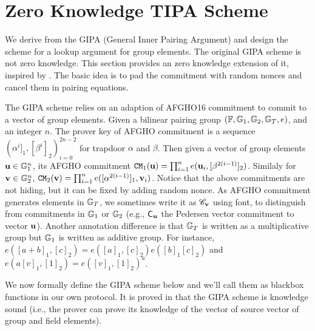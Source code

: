 \section{Zero Knowledge TIPA Scheme}
\label{sec:zkgipa}
We derive from the GIPA (General Inner Pairing Argument) \cite{Bunz21}
and design the scheme for a lookup argument for group elements.
The original GIPA scheme is not zero knowledge. This section provides
an zero knowledge extension of it, inspired by \cite[Appendix E]{Bunz21}.
The basic idea is to pad the commitment with random nonces and
cancel them in pairing equations.

The GIPA scheme relies on an adaption of
AFGHO16 commitment \cite{Abe16} to commit to a vector of group elements.
Given a bilinear pairing group $(\mathbb{F},{\mathbb{G}}_1, {\mathbb{G}}_2, {\mathbb{G}}_T, e)$, and an integer
$n$. The prover key of AFGHO commitment is a sequence
$\left(\alpha^{i}]_1, [\beta^{i}]_2\right)_{i=0}^{2n-2}$ for trapdoor
$\alpha$ and $\beta$. Then given a vector of group elements
${{\mathbf {u}}} \in {\mathbb{G}}_1^n$, its AFGHO commitment
${\mathtt{CM}}_1({{\mathbf {u}}}) = \prod_{i=1}^n e({{\mathbf {u}}}_i, [\beta^{2(i-1)}]_2)$.
Similaly for ${{\mathbf {v}}} \in {\mathbb{G}}_2^n$, 
${\mathtt{CM}}_2({{\mathbf {v}}}) = \prod_{i=1}^n e([\alpha^{2(i-1)}]_1, {{\mathbf {v}}}_i)$.
Notice that the above commitments are not hiding, but
it can be fixed by adding random nonce.
As AFGHO commitment generates elements in ${\mathbb{G}}_T$, we sometimes write
it as ${\mathscr{C}}_{{{\mathbf {v}}}}$ using  font, to distinguish
from commitments in ${\mathbb{G}}_1$ or ${\mathbb{G}}_2$ (e.g., ${\mathsf{C}}_{{{\mathbf {u}}}}$ the
Pedersen vector commitment to vector ${{\mathbf {u}}}$).
Another annotation difference is that ${\mathbb{G}}_T$ is written as a multiplicative
group but ${\mathbb{G}}_1$ is written as additive group. For instance,
$e([a+b]_1, [c]_2) = e([a]_1, [c]_2) e([b]_1 [c]_2)$
and $e(a[v]_1, [1]_2) = e([v]_1, [1]_2)^a$.

We now formally define the GIPA scheme below and we'll call them
as blackbox functions in our own protocol. It is proved in \cite{Bunz21}
that the GIPA scheme is knowledge sound (i.e., the prover can prove
its knowledge of the vector of source vector of group and field elements).


